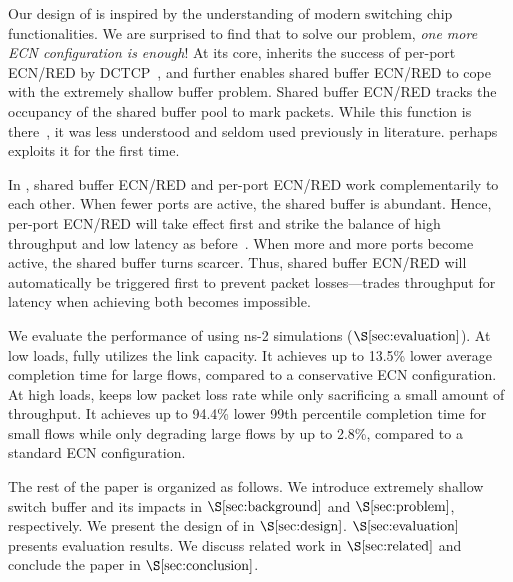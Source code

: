 
Our design of \sys is inspired by the understanding of modern switching chip functionalities. We are surprised to find that to solve our problem, \emph{one more ECN configuration is enough}! At its core, \sys inherits the success of per-port ECN/RED by DCTCP~\cite{dctcp}, and further enables shared buffer ECN/RED to cope with the extremely shallow buffer problem. Shared buffer ECN/RED tracks the occupancy of the shared buffer pool to mark packets. While this function is there~\cite{arista_ecn,mqecn}, it was less understood and seldom used previously in literature. \sys perhaps exploits it for the first time.

In \sys, shared buffer ECN/RED and per-port ECN/RED work complementarily to each other. When fewer ports are active, the shared buffer is abundant. Hence, per-port ECN/RED will take effect first and strike the balance of high throughput and low latency as before~\cite{dctcp}. When more and more ports become active, the shared buffer turns scarcer. Thus, shared buffer ECN/RED will automatically be triggered first to prevent packet losses---\sys trades throughput for latency when achieving both becomes impossible.


We evaluate the performance of \sys using ns-2 simulations ($\S\ref{sec:evaluation}$). At low loads, \sys fully utilizes the link capacity. It achieves up to 13.5\% lower average completion time for large flows, compared to a conservative ECN configuration. At high loads, \sys keeps low packet loss rate while only sacrificing a small amount of throughput. It achieves up to 94.4\% lower 99th percentile completion time for small flows while only degrading large flows by up to 2.8\%, compared to a standard ECN configuration.

The rest of the paper is organized as follows. We introduce extremely shallow switch buffer and its impacts in $\S\ref{sec:background}$ and $\S\ref{sec:problem}$, respectively. We present the design of \sys in $\S\ref{sec:design}$. $\S\ref{sec:evaluation}$ presents evaluation results. We discuss related work in $\S\ref{sec:related}$ and conclude the paper in $\S\ref{sec:conclusion}$.


